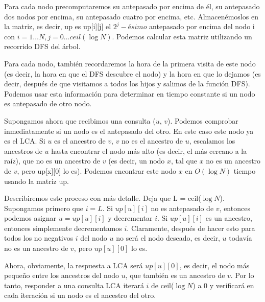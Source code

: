 Para cada nodo precomputaremos su antepasado por encima de él, su antepasado dos nodos por encima, su antepasado cuatro por encima, etc. Almacenémoslos en la matriz, es decir, up es up[i][j] el $2^j-ésimo$ antepasado por encima del nodo i con $i=1 \dots N, j=0 \dots ceil(\log N)$. Podemos calcular esta matriz utilizando un recorrido DFS del árbol.

Para cada nodo, también recordaremos la hora de la primera visita de este nodo (es decir, la hora en que el DFS descubre el nodo) y la hora en que lo dejamos (es decir, después de que visitamos a todos los hijos y salimos de la función DFS). Podemos usar esta información para determinar en tiempo constante si un nodo es antepasado de otro nodo.

Supongamos ahora que recibimos una consulta ($u$, $v$). Podemos comprobar inmediatamente si un nodo es el antepasado del otro. En este caso este nodo ya es el LCA. Si $u$ es el ancestro de $v$, $v$ no es el ancestro de $u$, escalamos los ancestros de $u$ hasta encontrar el nodo más alto (es decir, el más cercano a la raíz), que no es un ancestro de $v$ (es decir, un nodo $x$, tal que $x$ no es un ancestro de $v$, pero up[x][0] lo es). Podemos encontrar este nodo $x$ en $O(\log N)$ tiempo usando la matriz up.

Describiremos este proceso con más detalle. Deja que L = ceil($\log N$). Supongamos primero que $i = L$. Si $up[u][i]$ no es antepasado de $v$, entonces podemos asignar $u = up[u][i]$ y decrementar $i$. Si $up[u][i]$ es un ancestro, entonces simplemente decrementamos $i$. Claramente, después de hacer esto para todos los no negativos $i$ del nodo $u$ no será el nodo deseado, es decir, $u$ todavía no es un ancestro de $v$, pero $up[u][0]$ lo es.

Ahora, obviamente, la respuesta a LCA será $up[u][0]$, es decir, el nodo más pequeño entre los ancestros del nodo $u$, que también es un ancestro de $v$. Por lo tanto, responder a una consulta LCA iterará $i$ de ceil($\log N$) a 0 y verificará en cada iteración si un nodo es el ancestro del otro.